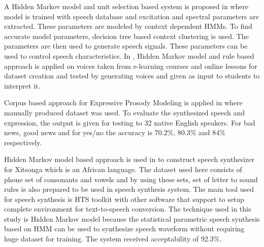 A Hidden Markov model and unit selection based system is proposed in \cite{tokuda2002hmm} where model is trained with speech database and excitation and spectral parameters are extracted. These parameters are modeled by context dependent HMMs. To find
accurate model parameters, decision tree based context clustering is used. The parameters are then used to generate speech
signals. These parameters can be used to control speech characteristics. In \cite{harashima2006review}, Hidden Markov model and rule based approach is applied 
on voices taken from e-learning courses and online lessons for dataset creation and tested by
generating voices and given as input to students to interpret it.

Corpus based approach for Expressive Prosody Modeling is applied in \cite{eide2004corpus} where 
manually produced dataset was used. To evaluate the synthesized
speech and expression, the output is given for testing to 32 native English speakers. For bad news, good news and
for yes/no the accuracy is 70.2\%, 80.3\% and 84\% respectively.


Hidden Markov model based approach is used in \cite{baloyi2012text} to construct
speech synthesizer for Xitsonga which is an African language. The dataset used here consists of phone
set of consonants and vowels and by using these sets, set of letter to sound rules is also prepared to be used in speech synthesis system. 
The main tool used for speech synthesis is HTS toolkit \cite{hts_2.2} with other software that support to setup complete environment for text-to-speech conversion.
The technique used in this study is Hidden Markov model because the statistical parametric speech synthesis based on HMM
can be used to synthesize speech waveform without requiring huge dataset for training. The system received acceptability
of 92.3\%. 

